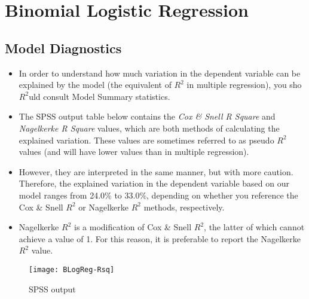 \documentclass[12pt]{article}
\begin{document}
\tableofcontents
\newpage
\section{Binomial Logistic Regression}

\subsection{Model Diagnostics}

\begin{itemize}
\item In order to understand how much variation in the dependent variable can be explained by the model (the equivalent of $R^2$ in multiple regression), you sho$R^2$uld consult Model Summary statistics.

\item The SPSS output table below contains the \textit{Cox \& Snell R Square} and \textit{Nagelkerke R Square }values, which are both methods of calculating the explained variation. These values are sometimes referred to as pseudo $R^2$ values (and will have lower values than in multiple regression).
\item  However, they are interpreted in the same manner, but with more caution. Therefore, the explained variation in the dependent variable based on our model ranges from 24.0\% to 33.0\%, depending on whether you reference the Cox \& Snell $R^2$ or Nagelkerke $R^2$ methods, respectively. 

\item Nagelkerke $R^2$ is a modification of Cox \& Snell $R^2$, the latter of which cannot achieve a value of 1. For this reason, it is preferable to report the Nagelkerke $R^2$ value.
\end{itemize}
\begin{figure}[h!]
\centering
\texttt{[image: BLogReg-Rsq]}
\caption{SPSS output}
\label{fig:BLogReg-Rsq}
\end{figure}
\end{document}
